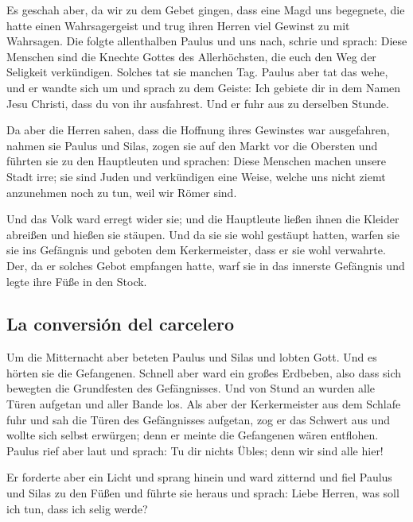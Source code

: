 Es geschah aber, da wir zu dem Gebet gingen, dass eine
Magd uns begegnete, die hatte einen Wahrsagergeist und trug ihren Herren
viel Gewinst zu mit Wahrsagen.  Die folgte allenthalben
Paulus und uns nach, schrie und sprach: Diese Menschen sind die Knechte
Gottes des Allerhöchsten, die euch den Weg der Seligkeit verkündigen.
 Solches tat sie manchen Tag. Paulus aber tat das wehe,
und er wandte sich um und sprach zu dem Geiste: Ich gebiete dir in dem
Namen Jesu Christi, dass du von ihr ausfahrest. Und er fuhr aus zu
derselben Stunde.

 Da aber die Herren sahen, dass die Hoffnung ihres
Gewinstes war ausgefahren, nahmen sie Paulus und Silas, zogen sie auf
den Markt vor die Obersten  und führten sie zu den
Hauptleuten und sprachen: Diese Menschen machen unsere Stadt irre; sie
sind Juden  und verkündigen eine Weise, welche uns nicht
ziemt anzunehmen noch zu tun, weil wir Römer sind.

 Und das Volk ward erregt wider sie; und die Hauptleute
ließen ihnen die Kleider abreißen und hießen sie stäupen.
 Und da sie sie wohl gestäupt hatten, warfen sie sie ins
Gefängnis und geboten dem Kerkermeister, dass er sie wohl verwahrte.
 Der, da er solches Gebot empfangen hatte, warf sie in
das innerste Gefängnis und legte ihre Füße in den Stock.

\hypertarget{la-conversiuxf3n-del-carcelero}{%
\subsection{La conversión del
carcelero}\label{la-conversiuxf3n-del-carcelero}}

 Um die Mitternacht aber beteten Paulus und Silas und
lobten Gott. Und es hörten sie die Gefangenen.  Schnell
aber ward ein großes Erdbeben, also dass sich bewegten die Grundfesten
des Gefängnisses. Und von Stund an wurden alle Türen aufgetan und aller
Bande los.  Als aber der Kerkermeister aus dem Schlafe
fuhr und sah die Türen des Gefängnisses aufgetan, zog er das Schwert aus
und wollte sich selbst erwürgen; denn er meinte die Gefangenen wären
entflohen.  Paulus rief aber laut und sprach: Tu dir
nichts Übles; denn wir sind alle hier!

 Er forderte aber ein Licht und sprang hinein und ward
zitternd und fiel Paulus und Silas zu den Füßen  und
führte sie heraus und sprach: Liebe Herren, was soll ich tun, dass ich
selig werde?

